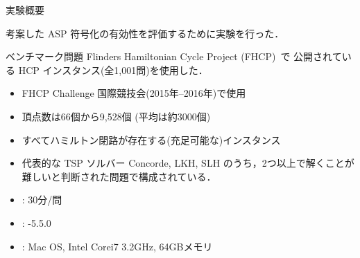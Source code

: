 \documentclass[dvipdfmx]{beamer}
\begin{document}
\begin{frame}{実験概要}
\begin{block}{}\centering
  考案した ASP 符号化の有効性を評価するために実験を行った．
\end{block}
\vfill

\begin{exampleblock}{ベンチマーク問題}
Flinders Hamiltonian Cycle Project (FHCP)~\footnotemark[2] で
公開されている HCP インスタンス(全1,001問)を使用した．
\begin{itemize}
\item FHCP Challenge 国際競技会(2015年--2016年)で使用
\item 頂点数は66個から9,528個 (平均は約3000個)
\item すべてハミルトン閉路が存在する(充足可能な)インスタンス
\item 代表的な TSP ソルバー \textsf{Concorde}, \textsf{LKH}, \textsf{SLH}
  のうち，2つ以上で解くことが難しいと判断された問題で構成されている．
\end{itemize}
\end{exampleblock}

\begin{itemize}
  \item {}: 30分/問
  \item {}: {\clingo}-5.5.0
  \item {}: Mac OS, Intel Corei7 3.2GHz, 64GBメモリ
\end{itemize}
\end{frame}
\end{document}
